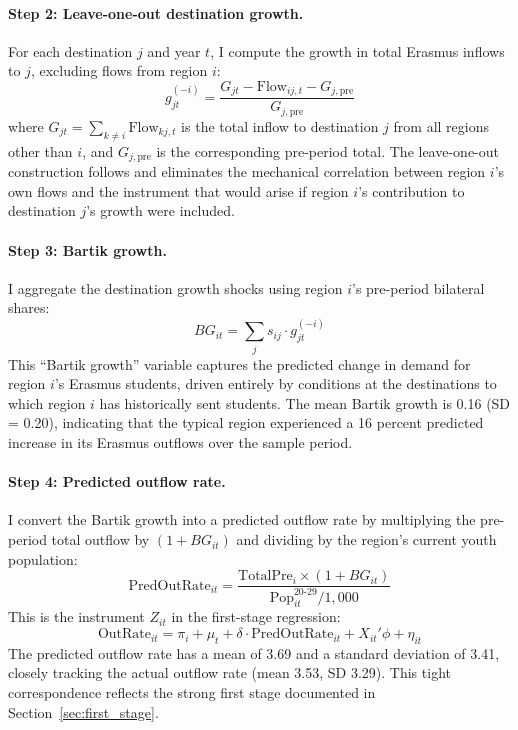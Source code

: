\documentclass[12pt]{article}
\begin{document}
\paragraph{Step 2: Leave-one-out destination growth.} For each destination $j$ and year $t$, I compute the growth in total Erasmus inflows to $j$, excluding flows from region $i$:
\begin{equation}
g_{jt}^{(-i)} = \frac{G_{jt} - \text{Flow}_{ij,t} - G_{j,\text{pre}}}{G_{j,\text{pre}}}
\label{eq:growth}
\end{equation}
where $G_{jt} = \sum_{k \neq i} \text{Flow}_{kj,t}$ is the total inflow to destination $j$ from all regions other than $i$, and $G_{j,\text{pre}}$ is the corresponding pre-period total. The leave-one-out construction follows \citet{borusyak_hull_jaravel_2022} and eliminates the mechanical correlation between region $i$'s own flows and the instrument that would arise if region $i$'s contribution to destination $j$'s growth were included.

\paragraph{Step 3: Bartik growth.} I aggregate the destination growth shocks using region $i$'s pre-period bilateral shares:
\begin{equation}
BG_{it} = \sum_j s_{ij} \cdot g_{jt}^{(-i)}
\label{eq:bartik}
\end{equation}
This ``Bartik growth'' variable captures the predicted change in demand for region $i$'s Erasmus students, driven entirely by conditions at the destinations to which region $i$ has historically sent students. The mean Bartik growth is 0.16 (SD = 0.20), indicating that the typical region experienced a 16 percent predicted increase in its Erasmus outflows over the sample period.

\paragraph{Step 4: Predicted outflow rate.} I convert the Bartik growth into a predicted outflow rate by multiplying the pre-period total outflow by $(1 + BG_{it})$ and dividing by the region's current youth population:
\begin{equation}
\text{PredOutRate}_{it} = \frac{\text{TotalPre}_i \times (1 + BG_{it})}{\text{Pop}_{it}^{20\text{-}29} / 1{,}000}
\label{eq:predicted}
\end{equation}
This is the instrument $Z_{it}$ in the first-stage regression:
\begin{equation}
\text{OutRate}_{it} = \pi_i + \mu_t + \delta \cdot \text{PredOutRate}_{it} + X_{it}'\phi + \eta_{it}
\label{eq:firststage}
\end{equation}
The predicted outflow rate has a mean of 3.69 and a standard deviation of 3.41, closely tracking the actual outflow rate (mean 3.53, SD 3.29). This tight correspondence reflects the strong first stage documented in Section~\ref{sec:first_stage}.
\end{document}
